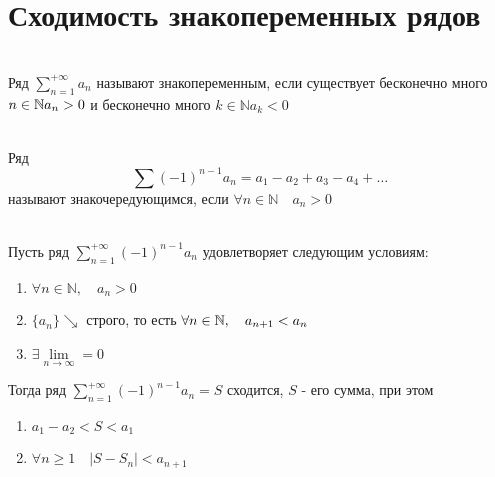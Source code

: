 \section{Сходимость знакопеременных рядов}

\begin{Def}~\\
    Ряд $\sum_{n=1}^{+\infty}a_n$ называют знакопеременным, если существует бесконечно много $n \in \mathbb{N} a_n>0$
    и бесконечно много $k \in \mathbb{N} a_k<0$\\
\end{Def}

\begin{Def}~\\
    Ряд 
    \[
        \sum (-1)^{n-1} a_n = a_1 - a_2 + a_3 - a_4 + \dots
    \] 
    называют знакочередующимся, если $\forall n \in \mathbb{N} \quad a_n > 0 $
\end{Def}

\begin{Th}~\\
    Пусть ряд $\sum_{n=1}^{+\infty} (-1)^{n-1} a_n $ удовлетворяет следующим условиям:
    \begin{enumerate}
        \item $\forall n \in \mathbb{N}, \quad a_n > 0$
         
        \item $\{a_n\} \searrow$ строго, то есть $\forall n \in \mathbb{N}, \quad a_{n+1}<a_n$
        
        \item $\exists \lim\limits_{n \to \infty}=0$
        
    \end{enumerate}
    Тогда ряд $\sum_{n=1}^{+\infty} (-1)^{n-1} a_n = S$ сходится, $S$ - его сумма, при этом
    \begin{enumerate}
        \item $a_1-a_2<S<a_1$
        
        \item $\forall n \geqslant 1 \quad |S-S_n|<a_{n+1}$
    \end{enumerate}
\end{Th}

